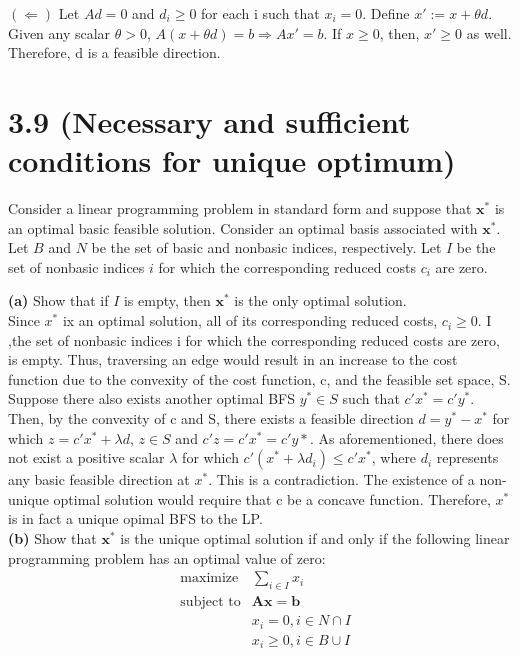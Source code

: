 \documentclass{article}
\begin{document}
\noindent
$(\Leftarrow)$
Let $Ad = 0$ and $d_i \geq 0 $ for each i such that $x_i = 0$.  Define $x' := x + \theta d$.  Given any scalar $\theta > 0$, $A(x + \theta d) = b \Rightarrow Ax' = b.$  If $x \geq 0$, then, $x' \geq 0$ as well.  Therefore, d is a feasible direction.  


\section*{3.9 (Necessary and sufficient conditions for  unique optimum)}
Consider a linear programming problem in standard form and suppose that $\mathbf{x^*}$ is an optimal basic feasible solution.  Consider an optimal basis associated with $\mathbf{x^*}$.  Let $B$ and $N$ be the set of basic and nonbasic indices, respectively.  Let $I$ be the set of nonbasic indices $i$ for which the corresponding reduced costs $c_i$ are zero.

\noindent \textbf{(a)}
Show that if $I$ is empty, then $\mathbf{x^*}$ is the only optimal solution.\\

\noindent 
Since $x^*$ ix an optimal solution, all of its corresponding reduced costs, $c_i \geq 0$.  I ,the set of nonbasic indices i for which the corresponding reduced costs are zero, is empty.  Thus, traversing an edge would result in an increase to the cost function due to the convexity of the cost function, c, and the feasible set space, S.\\

\noindent
Suppose there also exists another optimal BFS $y^* \in S$ such that $c'x^* = c'y^*$.  Then, by the convexity of c and S, there exists a feasible direction $d = y^* - x^*$ for which $z = c'x^* + \lambda d$, $z \in S$ and $c'z = c'x^* = c'y*$.  As aforementioned, there does not exist a positive scalar $\lambda$ for which $c'(x^* +  \lambda d_i) \leq c'x^*$, where $d_i$ represents any basic feasible direction at $x^*$.  This is a contradiction.  The existence of a non-unique optimal solution would require that c be a concave function.  Therefore, $x^*$ is in fact a unique opimal BFS to the LP.\\


\noindent \textbf{(b)} 
Show that $\mathbf{x^*}$ is the unique optimal solution if and only if the following linear programming problem has an optimal value of zero:\\

\begin{equation*}
\begin{aligned}
& \text{maximize} &  \sum_{i \in I} x_i \\
& \text{subject to} &  \mathbf{Ax = b}\\
& & x_i = 0, i \in N \cap I \\
& & x_i \geq 0, i \in B \cup I
\end{aligned}
\end{equation*}
\\
 
\end{document}

